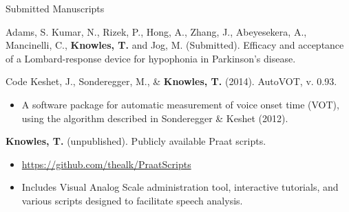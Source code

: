 \documentclass{resume} %
\begin{document}
\begin{rSection}{Submitted Manuscripts}

Adams, S. Kumar, N., Rizek, P., Hong, A., Zhang, J., Abeyesekera, A., Mancinelli, C., {\bf Knowles, T.} and Jog, M.  (Submitted). Efficacy and acceptance of a Lombard-response device for hypophonia in Parkinson's disease.


\end{rSection}



\begin{rSection}{Code}
	Keshet, J., Sonderegger, M., \& {\bf Knowles, T.} (2014). AutoVOT, v. 0.93.
	\begin{itemize}
			\renewcommand\labelitemi{$\cdot$}
		\item A software package for automatic measurement of voice onset time (VOT), using the algorithm described in Sonderegger \& Keshet (2012).
	\end{itemize}
	
	{\bf Knowles, T.} (unpublished). Publicly available Praat scripts.
	\begin{itemize}
			\renewcommand\labelitemi{$\cdot$}
		\item \url{https://github.com/thealk/PraatScripts}
		\item Includes Visual Analog Scale administration tool, interactive tutorials, and various scripts designed to facilitate speech analysis.
	\end{itemize}
\end{rSection}



\end{document}
